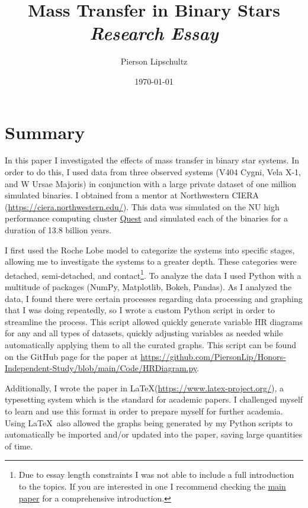 \documentclass[12pt, a4paper]{article}
\title{Mass Transfer in Binary Stars\\ \textit{Research Essay}}
\author{Pierson Lipschultz}
\begin{document}
\date{\today}
\maketitle
\section{Summary} 
    In this paper I investigated the effects of mass transfer in binary star systems. In order to do this, I used data from three observed systems (V404 Cygni, Vela X-1, and W Ursae Majoris) in conjunction with a large private dataset of one million simulated binaries. I obtained from a mentor at Northwestern CIERA (\url{https://ciera.northwestern.edu/}). This data was simulated on the NU high performance computing cluster \href{https://www.it.northwestern.edu/departments/it-services-support/research/computing/quest/}{Quest} and simulated each of the binaries for a duration of 13.8 billion years.

    I first used the Roche Lobe model to categorize the systems into specific stages, allowing me to investigate the systems to a greater depth. These categories were detached, semi-detached, and contact\footnote{Due to essay length constraints I was not able to include a full introduction to the topics. If you are interested in one I recommend checking the \href{https://github.com/PiersonLip/Honors-Independent-Study/blob/main/paper/Mass-Transfer-in-Binary-Stars.pdf}{main paper} for a comprehensive introduction.}.
    To analyze the data I used Python with a multitude of packages (NumPy, Matplotlib, Bokeh, Pandas). As I analyzed the data, I found there were certain processes regarding data processing and graphing that I was doing repeatedly, so I wrote a custom Python script in order to streamline the process. This script allowed quickly generate variable HR diagrams for any and all types of datasets, quickly adjusting variables as needed while automatically applying them to all the curated graphs. This script can be found on the GitHub page for the paper at \url{https://github.com/PiersonLip/Honors-Independent-Study/blob/main/Code/HRDiagram.py}.

	Additionally, I wrote the paper in \LaTeX (\url{https://www.latex-project.org/}), a typesetting system which is the standard for academic papers. I challenged myself to learn and use this format in order to prepare myself for further academia. Using \LaTeX ~also allowed the graphs being generated by my Python scripts to automatically be imported and/or updated into the paper, saving large quantities of time.
\end{document}
